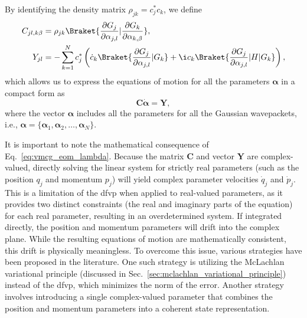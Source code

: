 By identifying the density matrix $\rho_{jk}=c_j^\ast c_k$, we define
\begin{align}
C_{jl,k\beta}&=\rho_{jk}\Braket{\frac{\partial G_j}{\partial \alpha_{j,l}}|\frac{\vphantom{G_j}\partial G_k}{\partial\alpha_{k,\beta}}},\\
Y_{jl}&=-\sum_{k=1}^Nc_j^\ast\left(\dot c_k\Braket{\frac{\partial G_j}{\partial\alpha_{j,l}}|G_k}+\i c_k\Braket{\frac{\partial G_j}{\partial\alpha_{j,l}}|H|G_k}\right),
\end{align}
which allows us to express the equations of motion for all the parameters $\symbf{\alpha}$ in a compact form as
\begin{equation}\label{eq:vmcg_eom_lambda}
\symbf{C}\dot{\symbf{\alpha}}=\symbf{Y},
\end{equation}
where the vector $\symbf{\alpha}$ includes all the parameters for all the Gaussian wavepackets, i.e., $\symbf{\alpha}=\lbrace\symbf{\alpha}_1,\symbf{\alpha}_2,\dots,\symbf{\alpha}_N\rbrace$.

It is important to note the mathematical consequence of Eq.~\eqref{eq:vmcg_eom_lambda}. Because the matrix $\symbf{C}$ and vector $\symbf{Y}$ are complex-valued, directly solving the linear system for strictly real parameters (such as the position $q_j$ and momentum $p_j$) will yield complex parameter velocities $\dot{q}_j$ and $\dot{p}_j$. This is a limitation of the \acrshort{dfvp} when applied to real-valued parameters, as it provides two distinct constraints (the real and imaginary parts of the equation) for each real parameter, resulting in an overdetermined system. If integrated directly, the position and momentum parameters will drift into the complex plane. While the resulting equations of motion are mathematically consistent, this drift is physically meaningless. To overcome this issue, various strategies have been proposed in the literature. One such strategy is utilizing the McLachlan variational principle (discussed in Sec.~\ref{sec:mclachlan_variational_principle}) instead of the \acrshort{dfvp}, which minimizes the norm of the error. Another strategy involves introducing a single complex-valued parameter that combines the position and momentum parameters into a coherent state representation.
